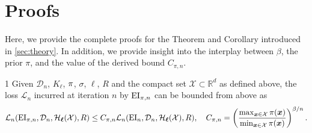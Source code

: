 \section{Proofs} \label{sec:appendix_proof}
Here, we provide the complete proofs for the Theorem and Corollary introduced in \ref{sec:theory}. In addition, we provide insight into the interplay between $\beta$, the prior $\pi$, and the value of the derived bound  $C_{\pi, n}$.

\begin{customthm}{1}\label{one}
Given $\mathcal{D}_n$, $K_{\bm{\ell}}$, ${\pi}$, $\sigma$, ${\bm{\ell}}$, $R$ and the compact set $\mathcal{X}\subset\mathbb{R}^d$ as defined above, the loss $\mathcal{L}_{n}$ incurred at iteration $n$ by $\text{EI}_{{\pi}, n}$
can be bounded from above as
\begin{equation}
    \mathcal{L}_{n}(\text{EI}_{{\pi}, n}, \mathcal{D}_n, \mathcal{H}_{\bm{\ell}}(\mathcal{X}), R) \leq C_{\pi, n} \mathcal{L}_{n}(\text{EI}_n, \mathcal{D}_n, \mathcal{H}_{\bm{\ell}}(\mathcal{X}), R), \quad C_{\pi, n} = \left(\frac{\max_{\bm{x}\in\mathcal{X}} \pi(\bm{x})}{\min_{\bm{x}\in\mathcal{X}} \pi(\bm{x})}\right)^{\beta/n}.
\end{equation}
\end{customthm}

